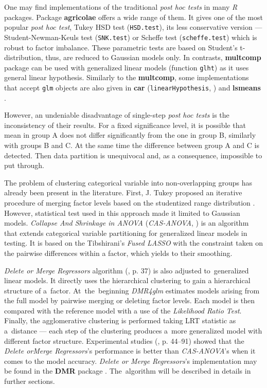 \documentclass[12pt]{article}
\newcommand{\code}{\texttt}
\begin{document}
One may find implementations of the traditional \emph{post hoc tests} in many \emph{R} packages. Package \textbf{agricolae} \citep{Agric} offers a wide range of them. It gives one of the most popular \emph{post hoc test}, Tukey HSD test (\code{HSD.test}), its less conservative version --- Student-Newman-Keuls test (\code{SNK.test}) or Scheffe test (\code{scheffe.test}) which is robust to factor imbalance. These parametric tests are based on Student's t-distribution, thus, are reduced to Gaussian models only. In contrasts, \textbf{multcomp} package \citep{Multcomp} can be used with generalized linear models (function \code{glht}) as it uses general linear hypothesis. Similarly to the \textbf{multcomp}, some implementations that accept \code{glm} objects are also given in \textbf{car} (\code{linearHypothesis}, \citealp{car}) and \textbf{lsmeans} \citep{lsmeans}.

However, an undeniable disadvantage of single-step \emph{post hoc tests} is the inconsistency of their results. For a fixed significance level, it is possible that mean in group A does not differ significantly from the one in group B, similarly with groups B and C. At the same time the difference between group A and C is detected. Then data partition is unequivocal and, as a consequence, impossible to put through. 

The problem of clustering categorical variable into non-overlapping groups has already been present in the literature. First, J. Tukey proposed an iterative procedure of merging factor levels based on the studentized range distribution \citep{Tukey}. However, statistical test used in this approach made it limited to Gaussian models. \emph{Collapse And Shrinkage in ANOVA} (\emph{CAS-ANOVA}, \citealp{Casanova}) is an algorithm that extends categorical variable partitioning for generalized linear models in testing. It is based on the Tibshirani's \emph{Fused LASSO} \citep{Tib} with the constraint taken on the pairwise differences within a factor, which yields to their smoothing.

\emph{Delete or Merge Regressors} algorithm (\citealp{Proch}, p. 37) is also adjusted to~generalized linear models. It directly uses the hierarchical clustering to gain a hierarchical structure of a~factor. At~the~beginning \emph{DMR4glm} estimates models arising from the full model by pairwise merging or deleting factor levels. Each model is then compared with the reference model with a use of the \emph{Likelihood Ratio Test}. Finally, the agglomerative clustering is performed taking LRT statistic as a~distance --- each step of the clustering produces a~more generalized model with different factor structure. Experimental studies (\citealp{Proch}, p. 44--91) showed that the \emph{Delete orMerge Regressors}'s performance is better than \emph{CAS-ANOVA}'s when it comes to the model accuracy. \emph{Delete or Merge Regressors}'s implementation may be found in the \textbf{DMR} package \citep{DMR}. The~algorithm will be described in details in further sections.
\end{document}
